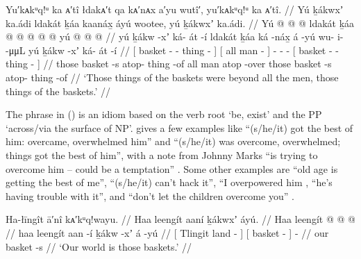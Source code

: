 \ex\label{ex:92-209-basket-things-all-men-too-much}%
%
\begingl
	\glpreamble	Yu′kᴀkᵘq!ᵘ ka ᴀ′tî łdakᴀ′t qa kᴀ′nᴀx a′yu wutî′, yu′kᴀkᵘq!ᵘ ka ᴀ′tî. //
	\glpreamble	Yú ḵákwxʼ ka.ádi ldakát ḵáa kaanáx̱ áyú wootee, yú ḵákwxʼ ka.ádi. //
	\gla	{} Yú  @ {}  @ {} @ {} {}
		{} ldakát ḵáa  @ {} {}
		 @ {}
		 @ {} @ {} @ {}
		{} yú  @ {}  @ {} @ {} {} //
	\glb	{} yú ḵákw -xʼ ká- át -í {}
		{} ldakát ḵáa ká -náx̱ {}
		á -yú
		wu- i-  -μμL
		{} yú ḵákw -xʼ ká- át -í {} //
	\glc	{}[  basket - - thing - {}]
		{}[ all man  - {}]
		- -  -
		{}[  basket - - thing - {}] //
	\gld	{} those basket -s atop- thing -of {}
		{} all man atop -over {}
		 {}
		 {} {} {}
		{} those basket -s atop- thing -of {} //
	\glft	‘Those things of the baskets were beyond all the men, those things of the baskets.’
		//
\endgl
\xe

The phrase  in (\lastx) is an idiom based on the verb root  ‘be, exist’ and the PP  ‘across/via the surface of NP’.
\citeauthor{leer:1976} gives a few examples like  “(s/he/it) got the best of him: overcame, overwhelmed him” and  “(s/he/it) was overcome, overwhelmed; things got the best of him”, with a note from  Johnny Marks “is trying to overcome him – could be a temptation” \parencite[389]{leer:1976}.
Some other examples are  “old age is getting the best of me”,  “(s/he/it) can’t hack it”,  “I overpowered him \parencite[all][06/162]{leer:1973},  “he’s having trouble with it”, and  “don’t let the children overcome you” \parencite[both][06/164]{leer:1973}.

\ex\label{ex:92-210-tlingit-land-baskets}%
%
\begingl
	\glpreamble	Ha-łīngît ā′nî kᴀ′kᵘq!wayu. //
	\glpreamble	Haa leengít aaní ḵákwxʼ áyú. //
	\gla	{} Haa leengít  @ {} {}
		{}  @ {} {}
		 @ {} //
	\glb	{} haa leengít aan -í {}
		{} ḵákw -xʼ {}
		á -yú //
	\glc	{}[  Tlingit land - {}]
		{}[ basket - {}]
		 - //
	\gld	{} our  {} {} {}
		{} basket -s {}
		 {} //
	\glft	‘Our world is those baskets.’
		//
\endgl
\xe

